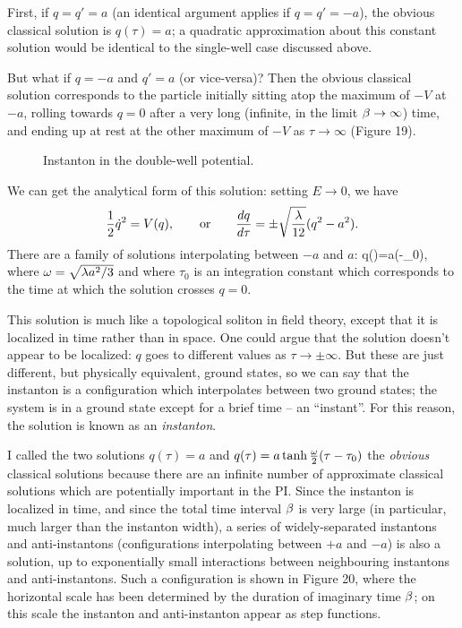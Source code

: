\documentclass[12pt]{article}
\begin{document}
First, if $q=q'=a$ (an identical argument applies if $q=q'=-a$), the
obvious classical
solution is $q(\tau)=a$; a quadratic approximation about this
constant solution would be identical to the single-well case discussed
above.

But what if $q=-a$ and $q'=a$ (or vice-versa)? Then the obvious
classical solution corresponds to the particle initially sitting atop the
maximum of $-V$ at $-a$, rolling towards $q=0$ after a very long
(infinite, in the limit ${\beta}\to\infty$) time, and ending up at
rest at the other maximum of $-V$ as $\tau\to\infty$ (Figure 19).
\begin{figure}[ht]
\epsfysize=5cm
\centerline{}
\caption{Instanton in the double-well potential.}
\end{figure}


We can get the analytical form of this solution: setting $E\to0$, we
have
\[
{\frac 12}{\dot q}^2=V(q),\qquad\mbox{or}\qquad
{dq\over d\tau}=\pm\sqrt{\lambda\over12}(q^2-a^2).
\]
There are a family of solutions interpolating between $-a$ and $a$:
\beq
q(\tau)=a(\tau-\tau_0),
\label{instanton}
\eeq
where ${\omega}=\sqrt{\lambda a^2/3}$ and where $\tau_0$ is an integration
constant which corresponds to the time at which the solution crosses
$q=0$.

This solution is much like a topological soliton in field theory,
except that it is localized in time rather than in space.
One could argue that the solution doesn't
appear to be localized: $q$ goes to different values as
$\tau\to\pm\infty$. But these are just different, but physically
equivalent, ground states, so we can say that the instanton is a
configuration which interpolates between two ground states; the
system is in a ground state except for a brief time -- an
``instant''. For this reason, the solution is known
as an {\em instanton}.

I called the two solutions $q(\tau)=a$ and
$q(\tau)=a\tanh{{\omega}\over2}(\tau-\tau_0)$ the {\em obvious} classical
solutions because there are an infinite number of approximate
classical solutions which are potentially important in the PI. Since
the instanton is localized in time, and since the total time interval
${\beta}$ is very large (in particular,
much larger than the instanton width), a series of widely-separated
instantons and anti-instantons (configurations interpolating between
$+a$ and $-a$) is also a solution, up to exponentially small
interactions between neighbouring instantons and anti-instantons. Such
a configuration is shown in Figure 20, where the horizontal scale has
been determined by the duration of imaginary time ${\beta}$; on this
scale the instanton and anti-instanton appear as step
functions.
\end{document}
